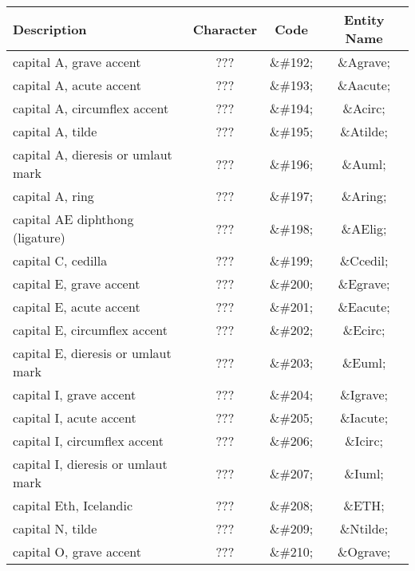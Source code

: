 \begin{table}[htbp]
  \begin{center}
    \leavevmode

    \begin{tabular}{lc>{\ttfamily}c>{\ttfamily}c}
      \textbf{Description} &
      \textbf{Character} &
      \textbf{Code} &
      \textbf{Entity Name} \\
      \hline
      capital A, grave accent            & ??? & \&\#192; & \&Agrave; \\
      capital A, acute accent            & ??? & \&\#193; & \&Aacute; \\
      capital A, circumflex accent       & ??? & \&\#194; & \&Acirc; \\
      capital A, tilde                   & ???    & \&\#195; & \&Atilde; \\
      \hline
      capital A, dieresis or umlaut mark & ??? & \&\#196; & \&Auml; \\
      capital A, ring                    & ??? & \&\#197; & \&Aring; \\
      capital AE diphthong (ligature)    & ??? & \&\#198; & \&AElig; \\
      capital C, cedilla                 & ??? & \&\#199; & \&Ccedil; \\
      \hline
      capital E, grave accent            & ??? & \&\#200; & \&Egrave; \\
      capital E, acute accent            & ??? & \&\#201; & \&Eacute; \\
      capital E, circumflex accent       & ??? & \&\#202; & \&Ecirc; \\
      capital E, dieresis or umlaut mark & ??? & \&\#203; & \&Euml; \\
      \hline
      capital I, grave accent            & ??? & \&\#204; & \&Igrave; \\
      capital I, acute accent            & ??? & \&\#205; & \&Iacute; \\
      capital I, circumflex accent       & ??? & \&\#206; & \&Icirc; \\
      capital I, dieresis or umlaut mark & ??? & \&\#207; & \&Iuml; \\
      \hline
      capital Eth, Icelandic             & ??? & \&\#208; & \&ETH; \\
      capital N, tilde                   & ??? & \&\#209; & \&Ntilde; \\
      capital O, grave accent            & ??? & \&\#210; & \&Ograve; \\

\end{tabular}
\end{center}
\end{table}
